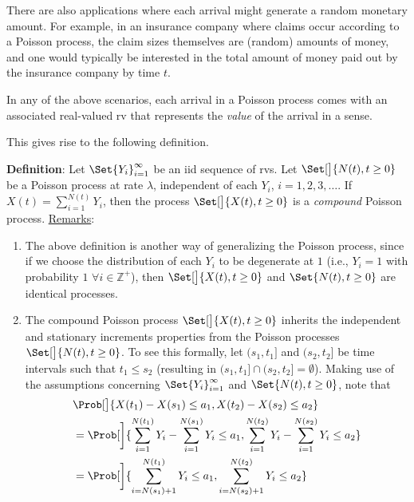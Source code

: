 There are also applications where each arrival might generate a random monetary amount.
For example, in an insurance company where claims occur according to a Poisson process, the
claim sizes themselves are (random) amounts of money, and one would typically be interested
in the total amount of money paid out by the insurance company by time $t$.

In any of the above scenarios, each arrival in a Poisson process comes with an associated
real-valued rv that represents the \emph{value} of the arrival in a sense.

This gives rise to the following definition.
\begin{Regular}
    \textbf{Definition}: Let $ \Set{Y_i}_{i=1}^\infty $ be an iid sequence of rvs. Let $ \Set[\big]{N(t),t\ge 0} $ be a
    Poisson process at rate $ \lambda $, independent of each $ Y_i $, $ i=1,2,3,\ldots $. If $ X(t)=\sum_{i=1}^{N(t)}Y_i $, then the
    process $ \Set[\big]{X(t),t\ge 0} $ is a \emph{compound} Poisson process.
    \tcblower{}
    \underline{Remarks}:
    \begin{enumerate}[(1)]
        \item The above definition is another way of generalizing the Poisson process, since if we
              choose the distribution of each $Y_i$ to be degenerate at $1$ (i.e., $Y_i = 1$ with probability $1$
              $ \forall i\in\mathbb{Z}^+ $), then $ \Set[\big]{X(t),t\ge 0} $ and $ \Set{N(t),t\ge 0} $ are identical processes.
        \item The compound Poisson process $ \Set[\big]{X(t),t\ge 0} $ inherits the independent and stationary increments
              properties from the Poisson processes $ \Set[\big]{N(t),t\ge 0} $. To see this formally,
              let $ (s_1,t_1] $ and $ (s_2,t_2] $ be time intervals such that $ t_1\le s_2 $ (resulting in $ (s_1,t_1] \cap (s_2,t_2]=\emptyset $).
                  Making use of the assumptions concerning $ \Set{Y_i}_{i=1}^\infty $ and $ \Set{N(t),t\ge 0} $, note that
              \begin{align*}
                   & \Prob[\big]{X(t_{1})-X(s_{1}) \leq a_{1}, X(t_{2})-X(s_{2}) \leq a_{2}}                                                                              \\
                   & =\Prob[\bigg]{\sum_{i=1}^{N(t_{1})} Y_{i}-\sum_{i=1}^{N(s_{1})}Y_{i} \leq a_{1}, \sum_{i=1}^{N(t_{2})} Y_{i}-\sum_{i=1}^{N(s_{2})} Y_{i} \leq a_{2}} \\
                   & =\Prob[\bigg]{\sum_{i=N(s_{1})+1}^{N(t_{1})} Y_{i}\leq a_{1}, \sum_{i=N(s_{2})+1}^{N(t_{2})} Y_{i} \leq a_{2}}                                       \\

\end{align*}
\end{enumerate}
\end{Regular}
